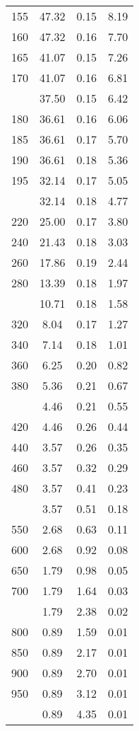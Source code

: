 \begin{table}[ht]
\begin{tabular}{lccc}
  155 & 47.32 & 0.15 & 8.19 \\ 
  160 & 47.32 & 0.16 & 7.70 \\ 
  165 & 41.07 & 0.15 & 7.26 \\ 
  170 & 41.07 & 0.16 & 6.81 \\ 
   \addlinespace
175 & 37.50 & 0.15 & 6.42 \\ 
  180 & 36.61 & 0.16 & 6.06 \\ 
  185 & 36.61 & 0.17 & 5.70 \\ 
  190 & 36.61 & 0.18 & 5.36 \\ 
  195 & 32.14 & 0.17 & 5.05 \\ 
   \addlinespace
200 & 32.14 & 0.18 & 4.77 \\ 
  220 & 25.00 & 0.17 & 3.80 \\ 
  240 & 21.43 & 0.18 & 3.03 \\ 
  260 & 17.86 & 0.19 & 2.44 \\ 
  280 & 13.39 & 0.18 & 1.97 \\ 
   \addlinespace
300 & 10.71 & 0.18 & 1.58 \\ 
  320 & 8.04 & 0.17 & 1.27 \\ 
  340 & 7.14 & 0.18 & 1.01 \\ 
  360 & 6.25 & 0.20 & 0.82 \\ 
  380 & 5.36 & 0.21 & 0.67 \\ 
   \addlinespace
400 & 4.46 & 0.21 & 0.55 \\ 
  420 & 4.46 & 0.26 & 0.44 \\ 
  440 & 3.57 & 0.26 & 0.35 \\ 
  460 & 3.57 & 0.32 & 0.29 \\ 
  480 & 3.57 & 0.41 & 0.23 \\ 
   \addlinespace
500 & 3.57 & 0.51 & 0.18 \\ 
  550 & 2.68 & 0.63 & 0.11 \\ 
  600 & 2.68 & 0.92 & 0.08 \\ 
  650 & 1.79 & 0.98 & 0.05 \\ 
  700 & 1.79 & 1.64 & 0.03 \\ 
   \addlinespace
750 & 1.79 & 2.38 & 0.02 \\ 
  800 & 0.89 & 1.59 & 0.01 \\ 
  850 & 0.89 & 2.17 & 0.01 \\ 
  900 & 0.89 & 2.70 & 0.01 \\ 
  950 & 0.89 & 3.12 & 0.01 \\ 
   \addlinespace
1000 & 0.89 & 4.35 & 0.01 \\ 
   \bottomrule
\end{tabular}
\end{table}
